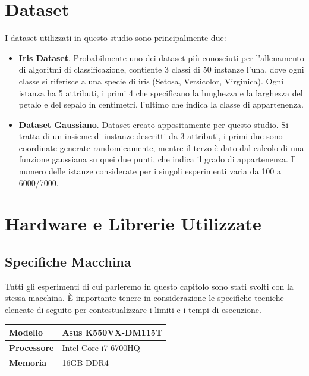 \documentclass[a4paper,12pt]{report}
\begin{document}
\section{Dataset}
I dataset utilizzati in questo studio sono principalmente due:
\begin{itemize}
    \item \textbf{Iris Dataset}. Probabilmente uno dei dataset più conosciuti per l'allenamento di algoritmi di classificazione, contiente 3 classi di 50 instanze l'una, dove ogni classe si riferisce a una specie di iris (Setosa, Versicolor, Virginica). Ogni istanza ha 5 attributi, i primi 4 che specificano la lunghezza e la larghezza del petalo e del sepalo in centimetri, l'ultimo che indica la classe di appartenenza. 
    \item \textbf{Dataset Gaussiano}. Dataset creato appositamente per questo studio. Si tratta di un insieme di instanze descritti da 3 attributi, i primi due sono coordinate generate randomicamente, mentre il terzo è dato dal calcolo di una funzione gaussiana su quei due punti, che indica il grado di appartenenza. Il numero delle istanze considerate per i singoli esperimenti varia da 100 a 6000/7000.
\end{itemize}

\section{Hardware e Librerie Utilizzate}
\subsection*{Specifiche Macchina}
Tutti gli esperimenti di cui parleremo in questo capitolo sono stati svolti con la stessa macchina. \`E importante tenere in considerazione le specifiche tecniche elencate di seguito per contestualizzare i limiti e i tempi di esecuzione. 
\smallskip

\begin{center}
    \begin{tabular}{|l|l|}
        \hline 
        \textbf{Modello} & Asus K550VX-DM115T \\
        \hline
        \textbf{Processore} & Intel Core i7-6700HQ \\
        \hline
        \textbf{Memoria} & 16GB DDR4 \\
        \hline
    \end{tabular}
\end{center}
\end{document}

